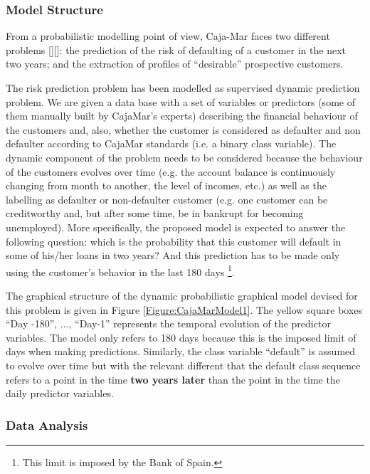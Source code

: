 \subsubsection*{Model Structure}

From a probabilistic modelling point of view, Caja-Mar faces two different problems [][]: the prediction of the risk of defaulting of a customer in the next two years; and the extraction of profiles of ``desirable'' prospective customers. 

The risk prediction problem has been modelled as supervised dynamic prediction problem.  We are given a data base with a set of variables or predictors (some of them manually built by CajaMar's experts) describing the financial behaviour of the customers and, also, whether the customer is considered as defaulter and non defaulter according to CajaMar standards (i.e. a binary class variable). The dynamic component of the problem needs to be considered because the behaviour of the customers evolves over time (e.g. the account balance is continuously changing from month to another, the level of incomes, etc.)  as well as the labelling as defaulter or non-defaulter customer (e.g. one customer can be creditworthy and, but after some time, be in bankrupt for becoming unemployed). More specifically, the proposed model is expected to answer the following question: which is the probability that this customer will  default in some of his/her loans in two years? And this prediction has to be made only using the customer's behavior in the last 180 days \footnote{This limit is imposed by the Bank of Spain.}.

The graphical structure of the dynamic probabilistic graphical model devised for this problem is given in Figure \ref{Figure:CajaMarModel1}.  The yellow square boxes ``Day -180'', ..., ``Day-1'' represents the temporal evolution of the predictor variables. The model only refers to 180 days because this is the imposed limit of days when making predictions. Similarly, the class variable ``default'' is assumed to evolve over time but with the relevant different that the default class sequence refers to a point in the time \textbf{two years later} than  the point in the time the daily predictor variables. 



\subsubsection*{Data Analysis}

